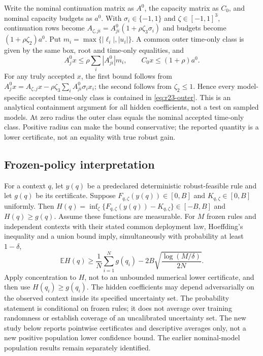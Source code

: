 \documentclass[11pt,letterpaper]{article}
\theoremstyle{definition}
\newcommand{\E}{\mathbb E}
\newcommand{\1}{\mathbf 1}
\begin{document}
Write the nominal continuation matrix as $A^0$, the capacity matrix as $C_0$, and nominal capacity budgets as $a^0$. With $\sigma_i\in\{-1,1\}$ and $\zeta\in[-1,1]^3$, continuation rows become $A_{\zeta,ji}=A^0_{ji}(1+\rho\zeta_3\sigma_i)$ and budgets become $(1+\rho\zeta_2)a^0$. Put $m_i=\max\{|\ell_i|,|u_i|\}$. A common outer time-only class is given by the same box, root and time-only equalities, and
\begin{equation}\label{eq:r23-outer}
 A^0_jx\leq\rho\sum_i|A^0_{ji}|m_i,\qquad
 C_0x\leq(1+\rho)a^0.
\end{equation}
For any truly accepted $x$, the first bound follows from
$A^0_jx=A_{\zeta,j}x-\rho\zeta_3\sum_iA^0_{ji}\sigma_ix_i$;
the second follows from $\zeta_2\leq1$. Hence every model-specific accepted time-only class is contained in \eqref{eq:r23-outer}. This is an analytical containment argument for all hidden coefficients, not a test on sampled models. At zero radius the outer class equals the nominal accepted time-only class. Positive radius can make the bound conservative; the reported quantity is a lower certificate, not an equality with true robust gain.

\subsection{Frozen-policy interpretation}
For a context $q$, let $y(q)$ be a predeclared deterministic robust-feasible rule and let $g(q)$ be its certificate. Suppose $F_{q,\zeta}(y(q))\in[0,B]$ and $K_{q,\zeta}\in[0,B]$ uniformly. Then $H(q)=\inf_\zeta\{F_{q,\zeta}(y(q))-K_{q,\zeta}\}\in[-B,B]$ and $H(q)\geq g(q)$. Assume these functions are measurable. For $M$ frozen rules and independent contexts with their stated common deployment law, Hoeffding's inequality and a union bound imply, simultaneously with probability at least $1-\delta$,
\[
 \E H(q)\geq\frac1N\sum_{i=1}^N g(q_i)
       -2B\sqrt{\frac{\log(M/\delta)}{2N}}.
\]
Apply concentration to $H$, not to an unbounded numerical lower certificate, and then use $H(q_i)\geq g(q_i)$. The hidden coefficients may depend adversarially on the observed context inside its specified uncertainty set. The probability statement is conditional on frozen rules; it does not average over training randomness or establish coverage of an uncalibrated uncertainty set. The new study below reports pointwise certificates and descriptive averages only, not a new positive population lower confidence bound. The earlier nominal-model population results remain separately identified.
\end{document}
